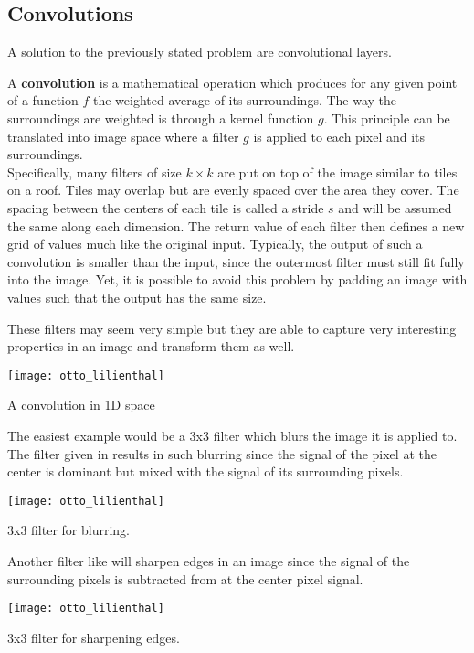 \subsection{Convolutions}
A solution to the previously stated problem are convolutional layers.

A \textbf{convolution} is a mathematical operation which produces for any given point of a function $f$ the weighted average of its surroundings.
The way the surroundings are weighted is through a kernel function $g$.
This principle can be translated into image space where a filter $g$ is applied to each pixel and its surroundings.\\
Specifically, many filters of size $k \times k$ are put on top of the image similar to tiles on a roof.
Tiles may overlap but are evenly spaced over the area they cover.
The spacing between the centers of each tile is called a stride $s$ and will be assumed the same along each dimension.
The return value of each filter then defines a new grid of values much like the original input.
Typically, the output of such a convolution is smaller than the input, since the outermost filter must still fit fully into the image.
Yet, it is possible to avoid this problem by padding an image with values such that the output has the same size.

These filters may seem very simple but they are able to capture very interesting properties in an image and transform them as well.
\begin{marginfigure}
    \texttt{[image: otto\_lilienthal]}
    \caption[]{A convolution in 1D space}
\end{marginfigure}
The easiest example would be a 3x3 filter which blurs the image it is applied to.
The filter given in  results in such blurring since the signal of the pixel at the center is dominant but mixed with the signal of its surrounding pixels.
\begin{marginfigure}
    \texttt{[image: otto\_lilienthal]}
    \caption[]{3x3 filter for blurring.}
\end{marginfigure}

Another filter like  will sharpen edges in an image since the signal of the surrounding pixels is subtracted from at the center pixel signal. 
\begin{marginfigure}
    \texttt{[image: otto\_lilienthal]}
    \caption[]{3x3 filter for sharpening edges.}
\end{marginfigure}

